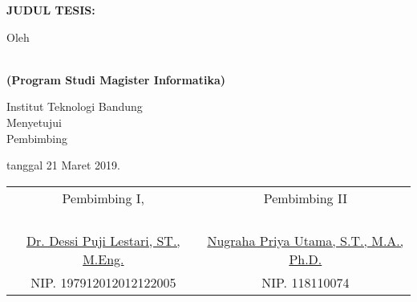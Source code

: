 \clearpage
\pagestyle{empty}

\begin{center}
\smallskip

	\begin{spacing}{1}
    	\Large \bfseries \MakeUppercase{Judul Tesis: \thetitle}
    \end{spacing}
    \vfill

    \large Oleh \\
    \begin{spacing}{1}
		\bfseries \Large \theauthor \\
		(Program Studi Magister Informatika)  
    \end{spacing}

    \large Institut Teknologi Bandung \\

    \vfill
    \normalsize \normalfont
    Menyetujui \\
    Pembimbing
    
    tanggal 21 Maret 2019.

    \vfill
    \setlength{\tabcolsep}{12pt}
    \begin{tabular}{c@{\hskip 0.5in}c}
       Pembimbing I, & Pembimbing II \\
       & \\
       & \\
       & \\
       & \\
       \underline{Dr. Dessi Puji Lestari, ST., M.Eng.} & \underline{Nugraha Priya Utama, S.T., M.A.,
       Ph.D.} \\
       NIP. 197912012012122005 & NIP. 118110074 \\
    \end{tabular}
    

\end{center}
\clearpage
